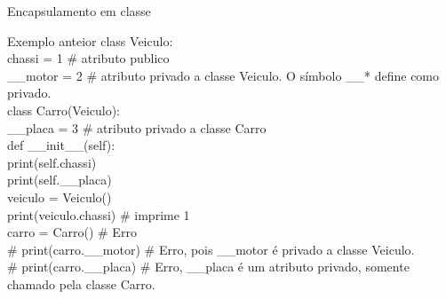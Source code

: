 \begin{frame}[t]{Encapsulamento em classe}
	
	\begin{block}{Exemplo anteior}		
		class Veiculo:\\
		\hspace{1em}chassi = 1 \# atributo publico\\
		\hspace{1em}\_\_motor = 2 \# atributo privado a classe Veiculo. O símbolo \_\_* define como privado.\\
		\vspace{0.5em}
		class Carro(Veiculo):\\
		\hspace{1em}\_\_placa = 3 \# atributo privado a classe Carro\\
		\vspace{0.5em}
		\hspace{1em}def \_\_init\_\_(self):\\
		\hspace{2em}print(self.chassi)\\
		\hspace{2em}print(self.\_\_placa)\\
		\vspace{0.5em}
		veiculo = Veiculo()\\
		print(veiculo.chassi) \# imprime 1\\
		\vspace{0.5em}
		carro = Carro() \# Erro\\
		\# print(carro.\_\_motor) \# Erro, pois \_\_motor é privado a classe Veiculo.\\
		\# print(carro.\_\_placa) \# Erro, \_\_placa é um atributo privado, somente chamado pela classe Carro.\\
	\end{block}
	
	
\end{frame}





